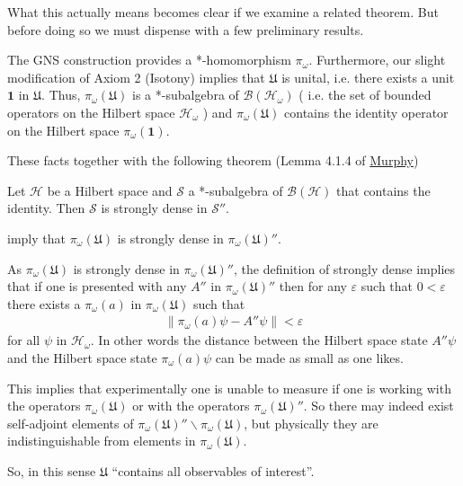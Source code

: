 What this actually means becomes clear if we examine a related theorem. But before doing so we must dispense with a few preliminary results.

The GNS construction provides a *-homomorphism $\pi_\omega$. Furthermore, our slight modification of Axiom 2 (Isotony) implies that $\mathfrak{U}$ is unital, i.e. there exists a unit $\mathbf{1}$ in $\mathfrak{U}$. Thus, $\pi_\omega(\mathfrak{U})$ is a *-subalgebra of $\mathcal{B}(\mathcal{H}_\omega)$ ( i.e. the set of bounded operators on the Hilbert space $\mathcal{H}_\omega$ ) and $\pi_\omega(\mathfrak{U})$ contains the identity operator on the Hilbert space $\pi_\omega(\mathbf{1})$.

These facts together with the following theorem (Lemma 4.1.4 of \href{https://doi.org/10.1016/C2009-0-22289-6}{Murphy})
\begin{theorem}
    Let $\mathcal{H}$ be a Hilbert space and $\mathcal{S}$ a *-subalgebra of $\mathcal{B}(\mathcal{H})$ that contains the identity. Then $\mathcal{S}$ is strongly dense in $\mathcal{S}''$.
\end{theorem}
\noindent imply that $\pi_\omega(\mathfrak{U})$ is strongly dense in $\pi_\omega(\mathfrak{U})''$.

As $\pi_\omega(\mathfrak{U})$ is strongly dense in $\pi_\omega(\mathfrak{U})''$, the definition of strongly dense implies that if one is presented with any $A''$ in $\pi_\omega(\mathfrak{U})''$ then for any $\varepsilon$ such that $0 < \varepsilon$ there exists a $\pi_\omega(a)$ in $\pi_\omega(\mathfrak{U})$ such that
\begin{align}
    \| \pi_\omega(a)\psi - A''\psi \| < \varepsilon
\end{align}
for all $\psi$ in $\mathcal{H}_\omega$. In other words the distance between the Hilbert space state $A''\psi$ and the Hilbert space state $\pi_\omega(a)\psi$ can be made as small as one likes.

This implies that experimentally one is unable to measure if one is working with the operators $\pi_\omega(\mathfrak{U})$ or with the operators $\pi_\omega(\mathfrak{U})''$. So there may indeed exist self-adjoint elements of $\pi_\omega(\mathfrak{U})'' \backslash \pi_\omega(\mathfrak{U})$, but physically they are indistinguishable from elements in $\pi_\omega(\mathfrak{U})$.

So, in this sense $\mathfrak{U}$ ``contains all observables of interest''.
